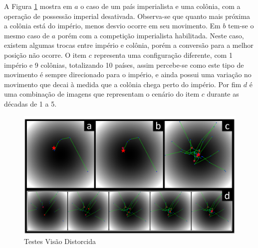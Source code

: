 A Figura \ref{fig:Testes_Vis_o_Imperial_Distorcida} mostra em \(a\) o caso de um país imperialista e uma colônia, com a operação de possessão imperial desativada. Observa-se que quanto mais próxima a colônia está do império, menos desvio ocorre em seu movimento. Em \(b\) tem-se o mesmo caso de \(a\) porém com a competição imperialista habilitada. Neste caso, existem algumas trocas entre império e colônia, porém a conversão para a melhor posição não ocorre. O item \(c\) representa uma configuração diferente, com 1 império e 9 colônias, totalizando 10 países, assim percebe-se como este tipo de movimento é sempre direcionado para o império, e ainda possui uma variação no movimento que decai à medida que a colônia chega perto do império. Por fim \(d\) é uma combinação de imagens que representam o cenário do item \(c\) durante as décadas de 1 a 5.

\begin{figure}[h]
	\centering
	\includegraphics[scale=0.6]{Figuras/Testes_Vis_o_Imperial_Distorcida.png}
	\caption{Testes Visão Distorcida}
	\label{fig:Testes_Vis_o_Imperial_Distorcida}
\end{figure}

